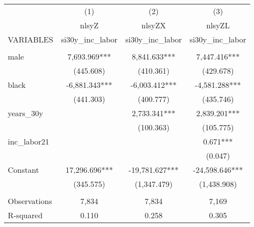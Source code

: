 \begin{tabular}{lccc} \hline
 & (1) & (2) & (3) \\
 & nlsyZ & nlsyZX & nlsyZL \\
VARIABLES & si30y\_inc\_labor & si30y\_inc\_labor & si30y\_inc\_labor \\ \hline
 &  &  &  \\
male & 7,693.969*** & 8,841.633*** & 7,447.416*** \\
 & (445.608) & (410.361) & (429.678) \\
black & -6,881.343*** & -6,003.412*** & -4,581.288*** \\
 & (441.303) & (400.777) & (435.746) \\
years\_30y &  & 2,733.341*** & 2,839.201*** \\
 &  & (100.363) & (105.775) \\
inc\_labor21 &  &  & 0.671*** \\
 &  &  & (0.047) \\
Constant & 17,296.696*** & -19,781.627*** & -24,598.646*** \\
 & (345.575) & (1,347.479) & (1,438.908) \\
 &  &  &  \\
Observations & 7,834 & 7,834 & 7,169 \\
 R-squared & 0.110 & 0.258 & 0.305 \\ \hline
\end{tabular}

